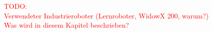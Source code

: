 \textcolor{red}{TODO:\\
Verwendeter Industrieroboter (Lernroboter, WidowX 200, warum?)\\
Was wird in diesem Kapitel beschrieben?
}




%












